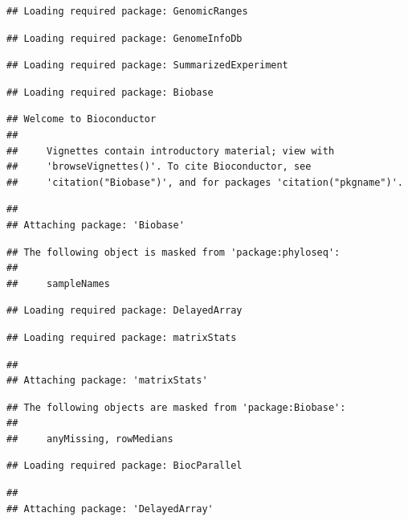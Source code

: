 \documentclass[]{article}
\begin{document}
\begin{verbatim}
## Loading required package: GenomicRanges
\end{verbatim}

\begin{verbatim}
## Loading required package: GenomeInfoDb
\end{verbatim}

\begin{verbatim}
## Loading required package: SummarizedExperiment
\end{verbatim}

\begin{verbatim}
## Loading required package: Biobase
\end{verbatim}

\begin{verbatim}
## Welcome to Bioconductor
## 
##     Vignettes contain introductory material; view with
##     'browseVignettes()'. To cite Bioconductor, see
##     'citation("Biobase")', and for packages 'citation("pkgname")'.
\end{verbatim}

\begin{verbatim}
## 
## Attaching package: 'Biobase'
\end{verbatim}

\begin{verbatim}
## The following object is masked from 'package:phyloseq':
## 
##     sampleNames
\end{verbatim}

\begin{verbatim}
## Loading required package: DelayedArray
\end{verbatim}

\begin{verbatim}
## Loading required package: matrixStats
\end{verbatim}

\begin{verbatim}
## 
## Attaching package: 'matrixStats'
\end{verbatim}

\begin{verbatim}
## The following objects are masked from 'package:Biobase':
## 
##     anyMissing, rowMedians
\end{verbatim}

\begin{verbatim}
## Loading required package: BiocParallel
\end{verbatim}

\begin{verbatim}
## 
## Attaching package: 'DelayedArray'
\end{verbatim}
\end{document}
